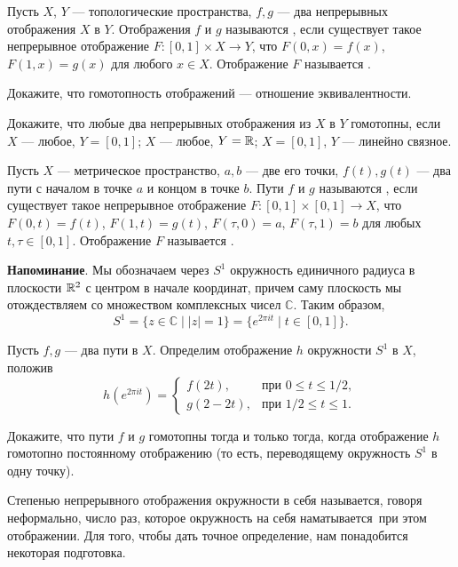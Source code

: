 \documentclass[a4paper,12pt]{article}
\newcommand{\0}[1]{\overline{#1}}
\renewcommand{\C}{\mathbb{C}}
\begin{document}

\vspace{-2mm}
\vspace{-2mm}

Пусть $X$, $Y$ --- топологические пространства, $f,g$ --- два непрерывных
отображения $X$ в $Y$. Отображения $f$ и $g$ называются
, если существует такое непрерывное отображение
$F:[0,1]\times X\to Y$, что $F(0,x)=f(x)$, $F(1,x)=g(x)$ для любого
$x\in X$. Отображение $F$ называется .


Докажите, что гомотопность отображений --- отношение эквивалентности.

Докажите, что любые два непрерывных отображения из $X$ в $Y$ гомотопны,
если
 $X$ --- любое, $Y=[0,1]$;
 $X$ --- любое, $Y=\mathbb{R}$;
 $X=[0,1]$, $Y$ --- линейно связное.

Пусть $X$ --- метрическое пространство, $a,b$ --- две его точки,
$f(t),g(t)$ --- два пути с началом в точке $a$ и концом в точке $b$.
Пути $f$ и $g$ называются , если существует такое
непрерывное отображение $F:[0,1]\times[0,1]\to X$, что $F(0,t)=f(t)$,
$F(1,t)=g(t)$, $F(\tau,0)=a$, $F(\tau,1)=b$ для любых $t,\tau\in[0,1]$.
Отображение $F$ называется .



\noindent
{\bf Напоминание}.
Мы обозначаем через $S^1$ окружность единичного
радиуса в плоскости $\mathbb{R}^2$ с центром в начале координат, причем саму
плоскость мы отождествляем со множеством комплексных чисел $\C$.
Таким образом,
$$
S^1=\{z\in\C\mid |z|=1\}=\{e^{2\pi it}\mid t\in[0,1]\}.
$$



Пусть $f,g$ --- два пути в $X$. Определим отображение $h$ окружности
$S^1$ в $X$, положив
$$
h\left(e^{2\pi it}\right)=\left\{
\begin{array}{ll}
f(2t),&\mbox{при }0\le t\le 1/2,\\
g(2-2t),&\mbox{при }1/2\le t\le 1.
\end{array}
\right.
$$

Докажите, что пути $f$ и $g$ гомотопны тогда и только тогда, когда
отображение $h$ гомотопно постоянному отображению (то есть, переводящему
окружность $S^1$ в одну точку).


Степенью непрерывного отображения окружности в себя называется, говоря
неформально, число раз, которое окружность на себя  наматывается\
при этом отображении. Для того, чтобы дать точное определение, нам
понадобится некоторая подготовка.
\end{document}
